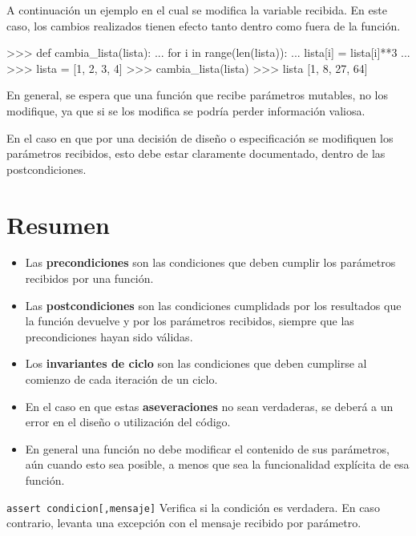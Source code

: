 A continuación un ejemplo en el cual se modifica la variable recibida. En este
caso, los cambios realizados tienen efecto tanto dentro como fuera de la
función.

\begin{codigo-python-sn}
>>> def cambia_lista(lista):
...     for i in range(len(lista)):
...             lista[i] = lista[i]**3
...
>>> lista = [1, 2, 3, 4]
>>> cambia_lista(lista)
>>> lista
[1, 8, 27, 64]
\end{codigo-python-sn}

\begin{atencion}
En general, se espera que una función que recibe parámetros mutables, no los
modifique, ya que si se los modifica se podría perder información valiosa.

En el caso en que por una decisión de diseño o especificación se modifiquen
los parámetros recibidos, esto debe estar claramente documentado, dentro de
las postcondiciones.
\end{atencion}

\section{Resumen}

\begin{itemize}
\item Las \textbf{precondiciones} son las condiciones que deben cumplir los
parámetros recibidos por una función.
\item Las \textbf{postcondiciones} son las condiciones cumplidads por los
resultados que la función devuelve y por los parámetros recibidos, siempre
que las precondiciones hayan sido válidas.
\item Los \textbf{invariantes de ciclo} son las condiciones que deben
cumplirse al comienzo de cada iteración de un ciclo.
\item En el caso en que estas \textbf{aseveraciones} no sean verdaderas, se
deberá a un error en el diseño o utilización del código.
\item En general una función no debe modificar el contenido de sus parámetros,
aún cuando esto sea posible, a menos que sea la funcionalidad explícita de esa
función.
\end{itemize}

\begin{referencia_python}

\begin{sintaxis}{\lstinline!assert condicion[,mensaje]!}
Verifica si la condición es verdadera.  En caso contrario, levanta una
excepción con el mensaje recibido por parámetro.
\end{sintaxis}

\end{referencia_python}

